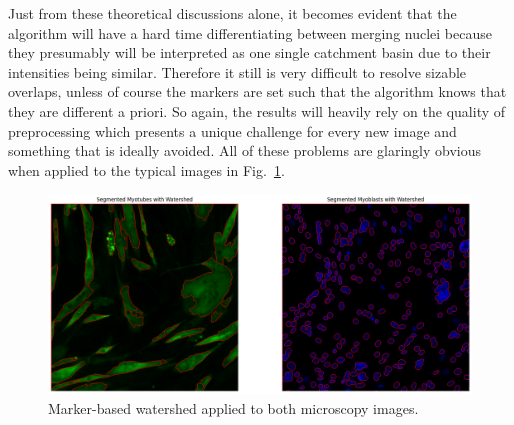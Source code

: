 Just from these theoretical discussions alone, it becomes evident that the algorithm will have a hard time differentiating between merging nuclei because they presumably will be interpreted as one single catchment basin due to their intensities being similar. Therefore it still is very difficult to resolve sizable overlaps, unless of course the markers are set such that the algorithm knows that they are different a priori. So again, the results will heavily rely on the quality of preprocessing which presents a unique challenge for every new image and something that is ideally avoided. All of these problems are glaringly obvious when applied to the typical images in Fig.~\ref{figwatershed}.

\begin{figure}
	\centering
	\includegraphics[width=\textwidth]{"images/watershed.png"}
	\caption[Application of watershed]{Marker-based watershed applied to both microscopy images.}
	\label{figwatershed}
\end{figure}

\newpage
